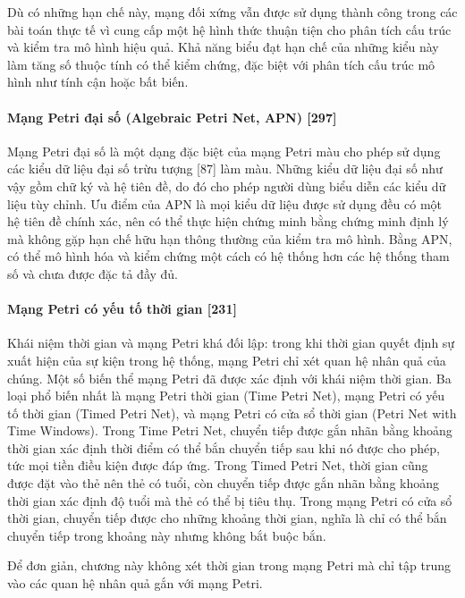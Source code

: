 Dù có những hạn chế này, mạng đối xứng vẫn được sử dụng thành công trong các bài toán thực tế vì cung cấp một hệ hình thức thuận tiện cho phân tích cấu trúc và kiểm tra mô hình hiệu quả. Khả năng biểu đạt hạn chế của những kiểu này làm tăng số thuộc tính có thể kiểm chứng, đặc biệt với phân tích cấu trúc mô hình như tính cận hoặc bất biến.

\paragraph{Mạng Petri đại số (Algebraic Petri Net, APN) [297]}
Mạng Petri đại số là một dạng đặc biệt của mạng Petri màu cho phép sử dụng các kiểu dữ liệu đại số trừu tượng [87] làm màu. Những kiểu dữ liệu đại số như vậy gồm chữ ký và hệ tiên đề, do đó cho phép người dùng biểu diễn các kiểu dữ liệu tùy chỉnh. Ưu điểm của APN là mọi kiểu dữ liệu được sử dụng đều có một hệ tiên đề chính xác, nên có thể thực hiện chứng minh bằng chứng minh định lý mà không gặp hạn chế hữu hạn thông thường của kiểm tra mô hình. Bằng APN, có thể mô hình hóa và kiểm chứng một cách có hệ thống hơn các hệ thống tham số và chưa được đặc tả đầy đủ.

\paragraph{Mạng Petri có yếu tố thời gian [231]}
Khái niệm thời gian và mạng Petri khá đối lập: trong khi thời gian quyết định sự xuất hiện của sự kiện trong hệ thống, mạng Petri chỉ xét quan hệ nhân quả của chúng. Một số biến thể mạng Petri đã được xác định với khái niệm thời gian. Ba loại phổ biến nhất là mạng Petri thời gian (Time Petri Net), mạng Petri có yếu tố thời gian (Timed Petri Net), và mạng Petri có cửa sổ thời gian (Petri Net with Time Windows). Trong Time Petri Net, chuyển tiếp được gắn nhãn bằng khoảng thời gian xác định thời điểm có thể bắn chuyển tiếp sau khi nó được cho phép, tức mọi tiền điều kiện được đáp ứng. Trong Timed Petri Net, thời gian cũng được đặt vào thẻ nên thẻ có tuổi, còn chuyển tiếp được gắn nhãn bằng khoảng thời gian xác định độ tuổi mà thẻ có thể bị tiêu thụ. Trong mạng Petri có cửa sổ thời gian, chuyển tiếp được cho những khoảng thời gian, nghĩa là chỉ có thể bắn chuyển tiếp trong khoảng này nhưng không bắt buộc bắn.

Để đơn giản, chương này không xét thời gian trong mạng Petri mà chỉ tập trung vào các quan hệ nhân quả gắn với mạng Petri.

